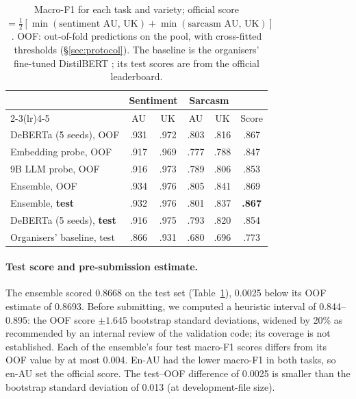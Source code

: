 \documentclass[11pt]{article}
\begin{document}
\begin{table}[t]
\centering\small
\setlength{\tabcolsep}{3.5pt}
\begin{tabular}{lccccc}
\toprule
 & \multicolumn{2}{c}{Sentiment} & \multicolumn{2}{c}{Sarcasm} & \\
\cmidrule(lr){2-3}\cmidrule(lr){4-5}
 & AU & UK & AU & UK & Score \\
\midrule
DeBERTa (5 seeds), OOF & .931 & .972 & .803 & .816 & .867 \\
Embedding probe, OOF & .917 & .969 & .777 & .788 & .847 \\
9B LLM probe, OOF & .916 & .973 & .789 & .806 & .853 \\
\midrule
Ensemble, OOF & .934 & .976 & .805 & .841 & .869 \\
Ensemble, \textbf{test} & .932 & .976 & .801 & .837 & \textbf{.867} \\
DeBERTa (5 seeds), \textbf{test} & .916 & .975 & .793 & .820 & .854 \\
\midrule
Organisers' baseline, test & .866 & .931 & .680 & .696 & .773 \\
\bottomrule
\end{tabular}
\caption{Macro-F1 for each task and variety; official score $=\frac12[\min(\text{sentiment AU, UK})+\min(\text{sarcasm
AU, UK})]$. OOF: out-of-fold predictions on the pool, with cross-fitted thresholds (\S\ref{sec:protocol}). The baseline is the organisers' fine-tuned DistilBERT
\citep{sanh2019distilbert,alta2026baseline}; its test scores are from the official leaderboard.}
\label{tab:main}
\end{table}

\paragraph{Test score and pre-submission estimate.} The ensemble scored 0.8668 on the test set (Table~\ref{tab:main}),
0.0025 below its OOF estimate of 0.8693. Before submitting, we computed a heuristic interval of 0.844--0.895: the OOF
score $\pm1.645$ bootstrap standard deviations, widened by 20\% as recommended by an internal review of the validation
code; its coverage is not established. Each of the ensemble's four test macro-F1 scores differs from its OOF value by at most 0.004.
En-AU had the lower macro-F1 in both tasks, so en-AU set the official score. The test--OOF difference of 0.0025 is
smaller than the bootstrap standard deviation of 0.013 (at development-file size).
\end{document}
